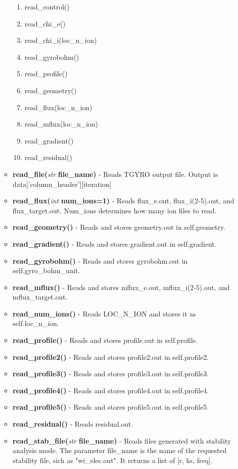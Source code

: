 \documentclass{article}
\begin{document}
\begin{itemize}
\begin{itemize}
\begin{enumerate}
\item read\_control()
\item read\_chi\_e()
\item read\_chi\_i(loc\_n\_ion)
\item read\_gyrobohm()
\item read\_profile()
\item read\_geometry()
\item read\_flux(loc\_n\_ion)
\item read\_mflux(loc\_n\_ion)
\item read\_gradient()
\item read\_residual()
\end{enumerate}
\item \textbf{read\_file(}\emph{str}\textbf{ file\_name)} - Reads TGYRO output file.  Output is data['column\_header'][iteration]
\item \textbf{read\_flux(}\emph{int}\textbf{ num\_ions=1)} - Reads flux\_e.out, flux\_i(2-5).out, and flux\_target.out.  Num\_ions determines how many ion files to read.
\item \textbf{read\_geometry()} - Reads and stores geometry.out in self.geometry.
\item \textbf{read\_gradient()} - Reads and stores gradient.out in self.gradient.
\item \textbf{read\_gyrobohm()} - Reads and stores gyrobohm.out in self.gyro\_bohm\_unit.
\item \textbf{read\_mflux()} - Reads and stores mflux\_e.out, mflux\_i(2-5).out, and mflux\_target.out.
\item \textbf{read\_num\_ions()} - Reads LOC\_N\_ION and stores it as self.loc\_n\_ion.
\item \textbf{read\_profile()} - Reads and stores profile.out in self.profile.
\item \textbf{read\_profile2()} - Reads and stores profile2.out in self.profile2.
\item \textbf{read\_profile3()} - Reads and stores profile3.out in self.profile3.
\item \textbf{read\_profile4()} - Reads and stores profile4.out in self.profile4.
\item \textbf{read\_profile5()} - Reads and stores profile5.out in self.profile5.
\item \textbf{read\_residual()} - Reads residual.out.
\item \textbf{read\_stab\_file(}\emph{str}\textbf{ file\_name)} - Reads files generated with stability analysis mode.  The parameter file\_name is the name of the requested stability file, sich as "wi\_elec.out".  It returns a list of [r, ks, freq].

\end{itemize}
\end{itemize}
\end{document}
